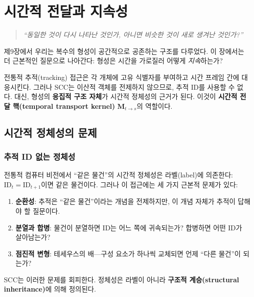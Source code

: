 
\chapter{시간적 전달과 지속성}
\label{ch:temporal-transport}

\begin{quote}
\textit{``동일한 것이 다시 나타난 것인가, 아니면 비슷한 것이 새로 생겨난 것인가?''}
\end{quote}

\vspace{0.5em}
제9장에서 우리는 복수의 형성이 공간적으로 공존하는 구조를 다루었다. 이 장에서는 더 근본적인 질문으로 나아간다: 형성은 시간을 가로질러 어떻게 \emph{지속}하는가?

전통적 추적(tracking) 접근은 각 개체에 고유 식별자를 부여하고 시간 프레임 간에 대응시킨다. 그러나 SCC는 이산적 객체를 전제하지 않으므로, 추적 ID를 사용할 수 없다. 대신, 형성의 \textbf{응집적 구조 자체}가 시간적 정체성의 근거가 된다. 이것이 \textbf{시간적 전달 핵(temporal transport kernel)} $\mathbf{M}_{t \to s}$의 역할이다.


\section{시간적 정체성의 문제}
\label{sec:temporal-identity-problem}

\subsection{추적 ID 없는 정체성}

전통적 컴퓨터 비전에서 ``같은 물건''의 시간적 정체성은 라벨(label)에 의존한다: $\mathrm{ID}_t = \mathrm{ID}_{t+1}$이면 같은 물건이다. 그러나 이 접근에는 세 가지 근본적 문제가 있다:

\begin{enumerate}
    \item \textbf{순환성}: 추적은 ``같은 물건''이라는 개념을 전제하지만, 이 개념 자체가 추적이 답해야 할 질문이다.
    \item \textbf{분열과 합병}: 물건이 분열하면 ID는 어느 쪽에 귀속되는가? 합병하면 어떤 ID가 살아남는가?
    \item \textbf{점진적 변형}: 테세우스의 배---구성 요소가 하나씩 교체되면 언제 ``다른 물건''이 되는가?
\end{enumerate}

SCC는 이러한 문제를 회피한다. 정체성은 라벨이 아니라 \textbf{구조적 계승(structural inheritance)}에 의해 정의된다.

